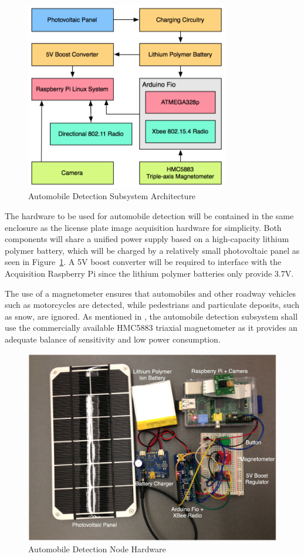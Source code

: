 \documentclass[11pt, oneside, fullpage, doublespace]{article}
\begin{document}
\begin{figure}
\begin{center}
\includegraphics[width=3.5in]{autodetection}
\end{center}
\caption{Automobile Detection Subsystem Architecture}
\label{fig:autodetect}
\end{figure}

The hardware to be used for automobile detection will be contained in the same enclosure as the license plate image acquisition hardware for simplicity. Both components will share a unified power supply based on a high-capacity lithium polymer battery, which will be charged by a relatively small photovoltaic panel as seen in Figure~\ref{fig:autodetect}. A 5V boost converter will be required to interface with the Acquisition Raspberry Pi since the lithium polymer batteries only provide 3.7V.

The use of a magnetometer ensures that automobiles and other roadway vehicles such as motorcycles are detected, while pedestrians and particulate deposits, such as snow, are ignored. As mentioned in \cite{stillwell2013}, the automobile detection subsystem shall use the commercially available HMC5883 triaxial magnetometer as it provides an adequate balance of sensitivity and low power consumption.

\begin{figure}
\begin{center}
\includegraphics[width=4.5in]{sensornode}
\end{center}
\caption{Automobile Detection Node Hardware}
\label{fig:autodetecthardware}
\end{figure}
\end{document}
